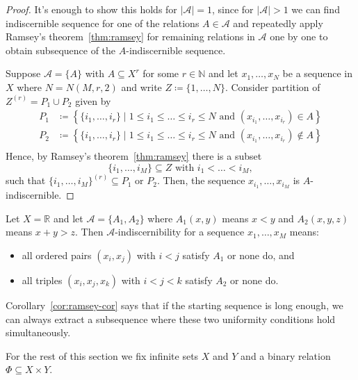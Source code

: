 \begin{proof}

    It's enough to show this holds for $|\mathcal{A}| = 1$, since for $|\mathcal{A}| > 1$ we can find indiscernible sequence for one of the relations $A \in \mathcal{A}$ and repeatedly apply Ramsey's theorem~\ref{thm:ramsey} for remaining relations in $\mathcal{A}$ one by one to obtain subsequence of the $A$-indiscernible sequence.

    Suppose $\mathcal{A} = \{A\}$ with $A \subseteq X^r$ for some $r \in \mathbb{N}$ and let $x_1, \dots, x_N$ be a sequence in $X$ where $N = N(M, r, 2)$ and write $Z \coloneq\{1, \dots, N\}$. Consider partition of $Z^{(r)} = P_1 \cup P_2$ given by
    \[
        \begin{aligned}
            P_1 &\coloneq \left\{ \{i_1, \dots, i_r\} \mid 1 \leq i_1 \leq \dots \leq i_r \leq N \text{ and } (x_{i_1}, \dots, x_{i_r}) \in A\right\} \\
            P_2 &\coloneq \left\{ \{i_1, \dots, i_r\} \mid 1 \leq i_1 \leq \dots \leq i_r \leq N \text{ and } (x_{i_1}, \dots, x_{i_r}) \notin A\right\} \\
        \end{aligned}
    \]
    Hence, by Ramsey's theorem~\ref{thm:ramsey} there is a subset
    \[
        \{i_1, \dots, i_M\} \subseteq Z \text{ with } i_1 < \dots < i_M,
    \]
    such that $\{i_1, \dots, i_M\}^{(r)} \subseteq P_1$ or $P_2$. Then, the sequence $x_{i_1}, \dots, x_{i_M}$ is $A$-indiscernible.
\end{proof}


\begin{examplenl}
    Let $X = \mathbb{R}$ and let $\mathcal{A} = \{A_1, A_2\}$ where $A_1(x, y)$ means $x < y$ and $A_2(x, y, z)$ means $x + y > z$.
    Then $\mathcal{A}$-indiscernibility for a sequence $x_1, \dots, x_M$ means:
    \begin{itemize}
        \item all ordered pairs $(x_i, x_j)$ with $i < j$ satisfy $A_1$ or none do, and
        \item all triples $(x_i, x_j, x_k)$ with $i < j < k$ satisfy $A_2$ or none do.
    \end{itemize}
    Corollary~\ref{cor:ramsey-cor} says that if the starting sequence is long enough, we can always extract a subsequence where these two uniformity conditions hold simultaneously.
\end{examplenl}

For the rest of this section we fix infinite sets $X$ and $Y$ and a binary relation $\Phi \subseteq X \times Y$.

